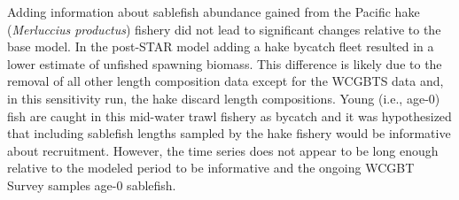 \documentclass[11pt,
  english,
  a4paper,
]{article}
\begin{document}
Adding information about sablefish abundance gained from the Pacific hake (\emph{Merluccius productus}) fishery did not lead to significant changes relative to the base model. In the post-STAR model adding a hake bycatch fleet resulted in a lower estimate of unfished spawning biomass. This difference is likely due to the removal of all other length composition data except for the WCGBTS data and, in this sensitivity run, the hake discard length compositions. Young (i.e., age-0) fish are caught in this mid-water trawl fishery as bycatch and it was hypothesized that including sablefish lengths sampled by the hake fishery would be informative about recruitment. However, the time series does not appear to be long enough relative to the modeled period to be informative and the ongoing WCGBT Survey samples age-0 sablefish.

\leavevmode\tagmcend\tagstructend\par
\end{document}
